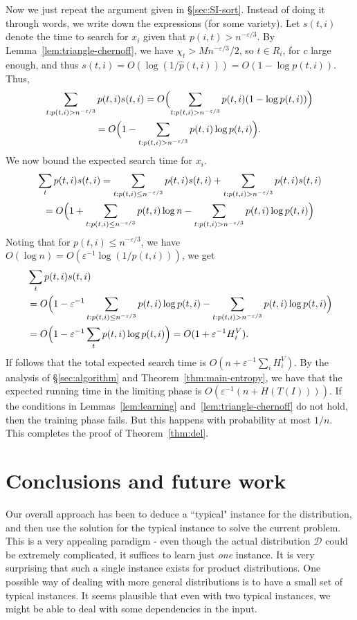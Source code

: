 \documentclass{siamltex}
\newcommand{\D}{\mathcal{D}}
\newcommand{\eps}{\varepsilon}
\begin{document}
Now we just repeat the argument
given in \S\ref{sec:SI-sort}. 
Instead of doing it through words, we 
write down the expressions (for some variety).
Let $s(t,i)$ denote
the time to search for $x_i$ given that $p(i,t) > n^{-\eps/3}$.
By Lemma~\ref{lem:triangle-chernoff}, we have $\chi_t > Mn^{-\eps/3}/2$,
so $t \in R_i$, for $c$ large enough, and thus
$s(t,i) = O(\log(1/\hat{p}(t,i))) = O(1 - \log p(t,i))$.
Thus,
\begin{multline*}
\sum_{t : p(t,i) > n^{-\eps/3} } p(t,i) s(t,i) =  
O\Bigl(\sum_{t : p(t,i) > n^{-\eps/3}} p(t,i) (1- \log p(t,i)) \Bigr)\\
= 
O\Bigl( 1-\sum_{t : p(t,i) > n^{-\eps/3}} p(t,i) \log p(t,i)\Bigr).
\end{multline*}
We now bound the expected search time for $x_i$.
\begin{multline*}
\sum_t p(t,i) s(t,i) =  
\sum_{t :  p(t,i) \leq n^{-\eps/3}} p(t,i) s(t,i) + 
\sum_{t : p(t,i) > n^{-\eps/3}} p(t,i) s(t,i) \\
=  O\Bigl(
1 +
\sum_{t :  p(t,i) \leq n^{-\eps/3}} p(t,i) \log n - 
\sum_{t : p(t,i) > n^{-\eps/3}} p(t,i) \log p(t,i) 
\Bigr)
\end{multline*}
Noting that for $p(t,i) \leq n^{-\eps/3}$, we have 
$O(\log n) = O(\eps^{-1}\log(1/p(t,i)))$, we get 
\begin{align*}
&\sum_t p(t,i) s(t,i) \\
&=  
 O\Bigl(
1 -
\eps^{-1} \sum_{t :  p(t,i) \leq n^{-\eps/3}} p(t,i)\log p(t,i) - 
\sum_{t : p(t,i) > n^{-\eps/3}} p(t,i) \log p(t,i) 
\Bigr)\\
&= O\Bigl(
1 -
\eps^{-1} \sum_{t} p(t,i)\log p(t,i)  
\Bigr)
= O(1+\eps^{-1}H_i^V).
\end{align*}
If follows that the total expected search time is 
$O(n + \eps^{-1}\sum_i H^V_i)$. By the
analysis of \S\ref{sec:algorithm} and Theorem~\ref{thm:main-entropy},
we have that the expected running time in the limiting phase is 
$O(\eps^{-1}(n + H(T(I))))$.
If the conditions in Lemmas~\ref{lem:learning} 
and~\ref{lem:triangle-chernoff} do not hold, then
the training phase fails. But this happens with probability
at most $1/n$.
This completes the proof of Theorem~\ref{thm:del}.

\section{Conclusions and future work}

Our overall approach has been to deduce a ``typical" instance for the
distribution, and then use the solution for the typical instance to solve the
current problem.  This is a very appealing paradigm - even though the actual
distribution $\D$ could be extremely complicated, it suffices to learn just
\emph{one} instance.  It is very surprising that such a single instance exists
for product distributions.  One possible way of dealing with more general
distributions is to have a small set of typical instances. It seems plausible
that even with two typical instances, we might be able to deal with some
dependencies in the input.
\end{document}
